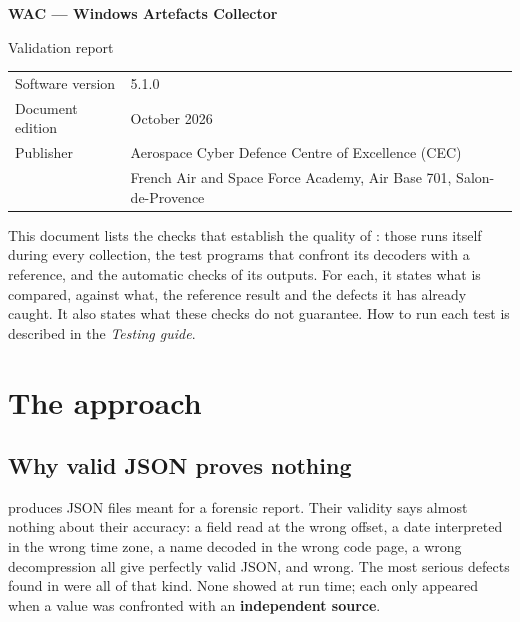 \documentclass[11pt,a4paper,oneside]{report}
\begin{document}

\thispagestyle{empty}
\vspace*{\fill}
{\color{marine}\Large\bfseries WAC — Windows Artefacts Collector}\par
{\color{bleu}Validation report}\par
\medskip
\begin{tabular}{@{}ll@{}}
Software version & 5.1.0 \\
Document edition & October 2026 \\
Publisher & Aerospace Cyber Defence Centre of Excellence (CEC) \\
          & French Air and Space Force Academy, Air Base 701, Salon-de-Provence \\
\end{tabular}

\bigskip
{\small\color{gris}This document lists the checks that establish the quality
of \wac{}: those \wac{} runs itself during every collection, the test programs
that confront its decoders with a reference, and the automatic checks of its
outputs. For each, it states what is compared, against what, the reference
result and the defects it has already caught. It also states what these checks
do not guarantee. How to run each test is described in the \emph{Testing
guide}.}
\vspace*{2cm}
\clearpage

\tableofcontents

\chapter{The approach}

\section{Why valid JSON proves nothing}

\wac{} produces JSON files meant for a forensic report. Their validity says
almost nothing about their accuracy: a field read at the wrong offset, a date
interpreted in the wrong time zone, a name decoded in the wrong code page, a
wrong decompression all give perfectly valid JSON, and wrong. The most serious
defects found in \wac{} were all of that kind. None showed at run time; each
only appeared when a value was confronted with an \textbf{independent source}.
\end{document}
